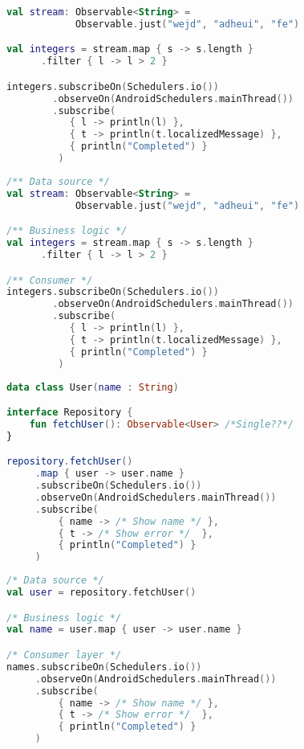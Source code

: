 \documentclass[10pt]{beamer}
\begin{document}
\begin{frame}[fragile]
\begin{lstlisting}[language=Kotlin, basicstyle=\ttfamily]
val stream: Observable<String> =
            Observable.just("wejd", "adheui", "fe")

val integers = stream.map { s -> s.length }
      .filter { l -> l > 2 }

integers.subscribeOn(Schedulers.io())
        .observeOn(AndroidSchedulers.mainThread())
        .subscribe(
           { l -> println(l) },
           { t -> println(t.localizedMessage) },
           { println("Completed") }
         )
\end{lstlisting} 
\end{frame}
\begin{frame}[fragile]
\begin{lstlisting}[language=Kotlin, basicstyle=\ttfamily]
/** Data source */
val stream: Observable<String> =
            Observable.just("wejd", "adheui", "fe")

/** Business logic */
val integers = stream.map { s -> s.length }
      .filter { l -> l > 2 }

/** Consumer */
integers.subscribeOn(Schedulers.io())
        .observeOn(AndroidSchedulers.mainThread())
        .subscribe(
           { l -> println(l) },
           { t -> println(t.localizedMessage) },
           { println("Completed") }
         )
\end{lstlisting} 
\end{frame}
\begin{frame}[fragile]
\begin{lstlisting}[language=Kotlin, basicstyle=\ttfamily]
data class User(name : String) 

interface Repository {
    fun fetchUser(): Observable<User> /*Single??*/
}

repository.fetchUser()
     .map { user -> user.name }
     .subscribeOn(Schedulers.io())
     .observeOn(AndroidSchedulers.mainThread())
     .subscribe(
         { name -> /* Show name */ },
         { t -> /* Show error */  },
         { println("Completed") }
     )       
\end{lstlisting}
\end{frame}

\begin{frame}[fragile]
\begin{lstlisting}[language=Kotlin, basicstyle=\ttfamily]
/* Data source */
val user = repository.fetchUser()

/* Business logic */
val name = user.map { user -> user.name }

/* Consumer layer */
names.subscribeOn(Schedulers.io())
     .observeOn(AndroidSchedulers.mainThread())
     .subscribe(
         { name -> /* Show name */ },
         { t -> /* Show error */  },
         { println("Completed") }
     )       
\end{lstlisting}
\end{frame}
\end{document}
